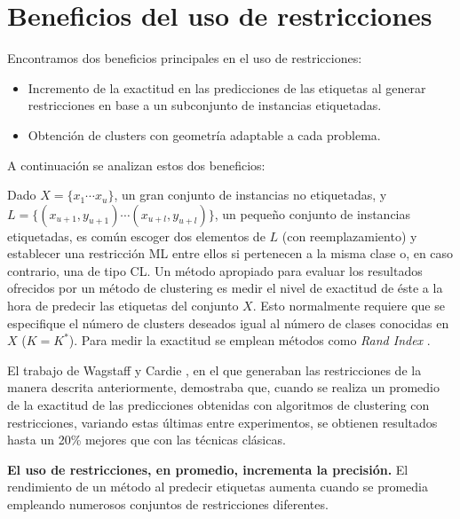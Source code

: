 \section{Beneficios del uso de restricciones}

Encontramos dos beneficios principales en el uso de restricciones: 

\begin{itemize}
	
	\item Incremento de la exactitud en las predicciones de las etiquetas al generar restricciones en base a un subconjunto de instancias etiquetadas.
	
	\item Obtención de clusters con geometría adaptable a cada problema.
	
\end{itemize}

A continuación se analizan estos dos beneficios:

Dado $X = \{x_1 \cdots x_u\}$, un gran conjunto de instancias no etiquetadas, y $L = \{(x_{u+1}, y_{u+1})\cdots (x_{u+l}, y_{u+l})\}$, un pequeño conjunto de instancias etiquetadas, es común escoger dos elementos de $L$ (con reemplazamiento) y establecer una restricción \acs{ML} entre ellos si pertenecen a la misma clase o, en caso contrario, una de tipo \acs{CL}. Un método apropiado para evaluar los resultados ofrecidos por un método de clustering es medir el nivel de exactitud de éste a la hora de predecir las etiquetas del conjunto $X$. Esto normalmente requiere que se especifique el número de clusters deseados igual al número de clases conocidas en $X$ ($K = K^*$). Para medir la exactitud se emplean métodos como \textit{Rand Index} \cite{Rand:1971}.

El trabajo de Wagstaff y Cardie \cite{WagstaffCardie:2000}, en el que generaban las restricciones de la manera descrita anteriormente, demostraba que, cuando se realiza un promedio de la exactitud de las predicciones obtenidas con algoritmos de clustering con restricciones, variando estas últimas entre experimentos, se obtienen resultados hasta un 20\% mejores que con las técnicas clásicas.

\begin{observacion}
	
	\textbf{El uso de restricciones, en promedio, incrementa la precisión.}
	El rendimiento de un método al predecir etiquetas aumenta cuando se promedia empleando numerosos conjuntos de restricciones diferentes. \cite{Survey:2007}
	\label{ob:observacion33}
	
\end{observacion}

